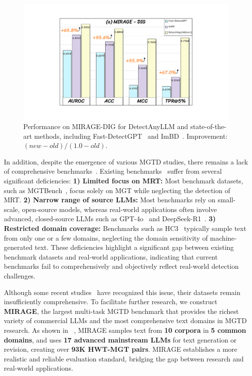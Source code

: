 \begin{figure}[t]
    \centering
    \includegraphics[width=0.985\linewidth]{fig/performance_comparison.pdf}
    \caption{Performance on MIRAGE-DIG for DetectAnyLLM and state-of-the-art methods, including Fast-DetectGPT~\cite{fastdetectgpt} and ImBD~\cite{imbd}. Improvement: $(new-old)/(1.0-old)$.}
    \label{fig:performance_comparison}
\end{figure}

In addition, despite the emergence of various MGTD studies, there remains a lack of comprehensive benchmarks~\cite{survey_necessity_methods_futuredirect}.
%
Existing benchmarks~\cite{mage, mgtbench, detectrl} suffer from several significant deficiencies: \textbf{1) Limited focus on MRT:} Most benchmark datasets, such as MGTBench~\cite{mgtbench}, focus solely on MGT while neglecting the detection of MRT. \textbf{2) Narrow range of source LLMs:} Most benchmarks rely on small-scale, open-source models, whereas real-world applications often involve advanced, closed-source LLMs such as GPT-4o~\cite{gpt4o} and DeepSeek-R1~\cite{deepseekr1}.  \textbf{3) Restricted domain coverage:} Benchmarks such as HC3~\cite{hc3} typically sample text from only one or a few domains, neglecting the domain sensitivity of machine-generated text.
%
These deficiencies highlight a significant gap between existing benchmark datasets and real-world applications, indicating that current benchmarks fail to comprehensively and objectively reflect real-world detection challenges.


Although some recent studies~\cite{survey_necessity_methods_futuredirect, hart} have recognized this issue, their datasets remain insufficiently comprehensive.
%
To facilitate further research,  we construct \textbf{MIRAGE}, the largest multi-task MGTD benchmark that provides the richest variety of commercial LLMs and the most comprehensive text domains in MGTD research.
%
As shown in ~, MIRAGE samples text from \textbf{10 corpora} in \textbf{5 common domains}, and uses \textbf{17 advanced mainstream LLMs} for text generation or revision, creating over \textbf{93K HWT-MGT pairs}.
%
MIRAGE establishes a more realistic and reliable evaluation standard, bridging the gap between research and real-world applications.



